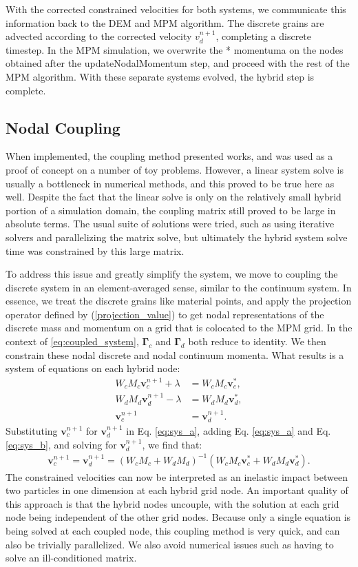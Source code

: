 With the corrected constrained velocities for both systems, we communicate this information back to the DEM and MPM algorithm. The discrete grains are advected according to the corrected velocity $v^{n+1}_d$, completing a discrete timestep. In the MPM simulation, we overwrite the * momentuma on the nodes obtained after the updateNodalMomentum step, and proceed with the rest of the MPM algorithm. With these separate systems evolved, the hybrid step is complete.

\subsection{Nodal Coupling}
When implemented, the coupling method presented works, and was used as a proof of concept on a number of toy problems. However, a linear system solve is usually a bottleneck in numerical methods, and this proved to be true here as well. Despite the fact that the linear solve is only on the relatively small hybrid portion of a simulation domain, the coupling matrix still proved to be large in absolute terms. The usual suite of solutions were tried, such as using iterative solvers and parallelizing the matrix solve, but ultimately the hybrid system solve time was constrained by this large matrix.

To address this issue and greatly simplify the system, we move to coupling the discrete system in an element-averaged sense, similar to the continuum system. In essence, we treat the discrete grains like material points, and apply the projection operator defined by (\ref{projection_value}) to get nodal representations of the discrete mass and momentum on a grid that is colocated to the MPM grid. In the context of \ref{eq:coupled_system}, $\bm{\Gamma}_c$ and $\bm{\Gamma}_d$ both reduce to identity. We then constrain these nodal discrete and nodal continuum momenta. What results is a system of equations on each hybrid node:
\begin{align}
W_c M_c \bm{v}_c^{n+1} + \lambda &= W_c M_c \bm{v}^*_c , \label{eq:sys_a} \\
W_d M_d \bm{v}_d^{n+1} - \lambda &= W_d M_d \bm{v}^*_d , \label{eq:sys_b} \\
\bm{v}_c^{n+1} &= \bm{v}_d^{n+1} . \label{eq:sys_c}
\end{align}
Substituting $\bm{v}_c^{n+1}$ for $\bm{v}_d^{n+1}$ in Eq. \eqref{eq:sys_a}, adding Eq. \eqref{eq:sys_a} and Eq. \eqref{eq:sys_b},
and solving for $\bm{v}_d^{n+1}$, we find that:
\begin{align}
\label{eq:inexpensive_coupling}
\bm{v}_c^{n+1} = \bm{v}_d^{n+1} = \left( W_c M_c + W_d M_d \right)^{-1} \left( W_c M_c \bm{v}_c^* + W_d M_d \bm{v}_d^* \right) .
\end{align}
The constrained velocities can now be interpreted as an
inelastic impact between two particles in one dimension at each hybrid grid node. An important quality of this approach is that the hybrid nodes uncouple, with the solution at each grid node being independent of the other grid nodes. Because only a single equation is being solved at each coupled node, this coupling method is very quick, and can also be trivially parallelized. We also avoid numerical issues such as having to solve an ill-conditioned matrix.

